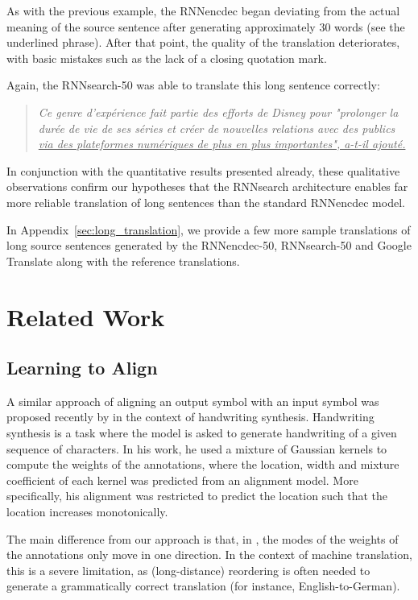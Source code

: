 \documentclass{article}
\begin{document}
As with the previous example, the RNNencdec began deviating from the actual meaning
of the source sentence after generating approximately 30 words (see the
underlined phrase). After that point, the quality of the translation
deteriorates, with basic mistakes such as the lack of a closing quotation mark.

Again, the RNNsearch-50 was able to translate this long sentence correctly:
\begin{quote}
{    \it
Ce genre d'exp\'erience fait partie des efforts de Disney pour "prolonger la
dur\'ee de vie de ses s\'eries et cr\'eer de nouvelles relations avec des
publics \uline{via des plateformes num\'eriques de plus en plus importantes", a-t-il
ajout\'e.} }
\end{quote}

In conjunction with the quantitative results presented already, these
qualitative observations confirm our hypotheses that the RNNsearch architecture
enables far more reliable translation of long sentences than the standard RNNencdec
model. 

In Appendix~\ref{sec:long_translation}, we provide a few more sample
translations of long source sentences generated by the RNNencdec-50, RNNsearch-50
and Google Translate along with the reference translations.

\section{Related Work}

\subsection{Learning to Align}

A similar approach of aligning an output symbol with an input symbol was
proposed recently by \citet{Graves2013} in the context of handwriting synthesis.
Handwriting synthesis is a task where the model is asked to generate handwriting
of a given sequence of characters. In his work, he used a mixture of Gaussian
kernels to compute the weights of the annotations, where the location, width and
mixture coefficient of each kernel was predicted from an alignment model. More
specifically, his alignment was restricted to predict the location such that the
location increases monotonically.

The main difference from our approach is that, in \citep{Graves2013}, the modes
of the weights of the annotations only move in one direction. In the context of
machine translation, this is a severe limitation, as (long-distance) reordering
is often needed to generate a grammatically correct translation (for instance,
English-to-German).
\end{document}
